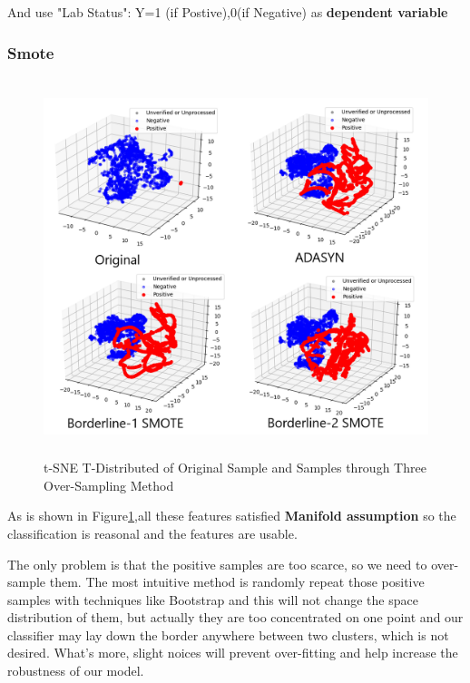 \documentclass[12pt]{article}
\begin{document}
And use "Lab Status": Y=1 (if Postive),0(if Negative) as \textbf{dependent variable}



\subsubsection{Smote}
\begin{figure}[H]
	\small
	\label{u=tsne}
	\centering
	\includegraphics[width=13cm,height=11cm]{./pictures/tsne.png}
	\caption{t-SNE T-Distributed of Original Sample and Samples through Three Over-Sampling Method}\protect\footnotemark[1] 
\end{figure}

As is shown in Figure\protect\ref{u=tsne},all these features satisfied \textbf{Manifold assumption} so the classification is reasonal and the features are usable.

The only problem is that the positive samples are too scarce, so we need to over-sample them. The most intuitive method is randomly repeat those positive samples with techniques like Bootstrap and this will not change the space distribution of them, but actually they are too concentrated on one point and our classifier may lay down the border anywhere between two clusters, which is not desired. What's more, slight noices will prevent over-fitting and help increase the robustness of our model.
\end{document}
